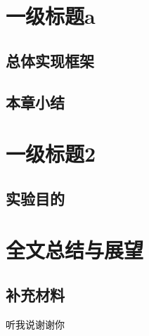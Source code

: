 ﻿\documentclass{NCEPU-thesis}
\begin{document}
\chapter{一级标题a}

\section{总体实现框架}

\section{本章小结}

\chapter{一级标题2}

\section{实验目的}

\chapter*{全文总结与展望}

\nocite{*}



\thesissingleappendix
\section{补充材料}

\thesisacknowledgement

听我说谢谢你
\end{document}
